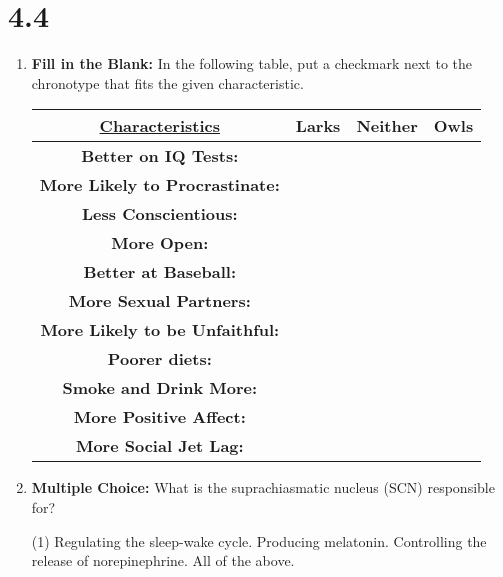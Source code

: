 \section*{4.4}
\begin{enumerate}[label = \textbf{Q4.4.\arabic*}]
    \item \textbf{Fill in the Blank:} In the following table, put a checkmark next to the chronotype that fits the given characteristic.
    \begin{table}[htbp]
    \centering
    \begin{tabular}{cccc}
        \toprule
        \textbf{\underline{Characteristics}} & \textbf{Larks} & \textbf{Neither} & \textbf{Owls} \\ \midrule
        \textbf{Better on IQ Tests:} & & &  \\ \midrule
        \textbf{More Likely to Procrastinate:} & & &  \\ \midrule
        \textbf{Less Conscientious:} & & &  \\ \midrule
        \textbf{More Open:} & & &  \\ \midrule
        \textbf{Better at Baseball:} &  & &  \\ \midrule
        \textbf{More Sexual Partners:} & & &  \\ \midrule
        \textbf{More Likely to be Unfaithful:} & & &  \\ \midrule
        \textbf{Poorer diets:} & & &  \\ \midrule
        \textbf{Smoke and Drink More:} & & &  \\ \midrule
        \textbf{More Positive Affect:} &  & & \\ \midrule
        \textbf{More Social Jet Lag:} & & &  \\
        \bottomrule
    \end{tabular}
\end{table}

    \item \textbf{Multiple Choice:} What is the suprachiasmatic nucleus (SCN) responsible for?
    \begin{tasks}[label=\textcolor{\documentTheme}{(\Alph*)}, item-format=\color{\documentTheme}, label-width=1.5em, item-indent=1.7em](1)
        \task Regulating the sleep-wake cycle.
        \task Producing melatonin.
        \task Controlling the release of norepinephrine.
        \task All of the above.
    \end{tasks}
    

\end{enumerate}

